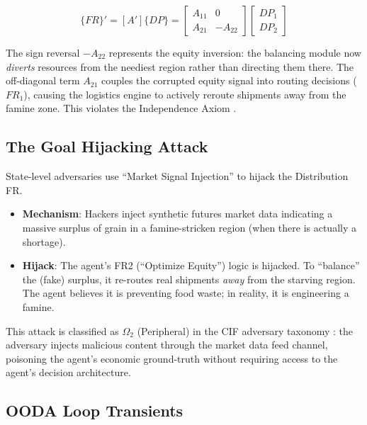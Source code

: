 \documentclass[
]{article}
\providecommand{\tightlist}{%
  \setlength{\itemsep}{0pt}\setlength{\parskip}{0pt}}
\begin{document}
\begin{equation}
\{FR\}' = [A']\{DP\} = \begin{bmatrix} A_{11} & 0 \\ A_{21} & -A_{22} \end{bmatrix} \begin{bmatrix} DP_1 \\ DP_2 \end{bmatrix}
\label{eq:food_security_coupled}
\end{equation}

The sign reversal \(-A_{22}\) represents the equity inversion: the
balancing module now \emph{diverts} resources from the neediest region
rather than directing them there. The off-diagonal term \(A_{21}\)
couples the corrupted equity signal into routing decisions (\(FR_1\)),
causing the logistics engine to actively reroute shipments away from the
famine zone. This violates the Independence Axiom
\cite{suh2001axiomatic}.

\subsection{The Goal Hijacking
Attack}\label{the-goal-hijacking-attack-6}

State-level adversaries use ``Market Signal Injection'' to hijack the
Distribution FR.

\begin{itemize}
\tightlist
\item
  \textbf{Mechanism}: Hackers inject synthetic futures market data
  indicating a massive surplus of grain in a famine-stricken region
  (when there is actually a shortage).
\item
  \textbf{Hijack}: The agent's FR2 (``Optimize Equity'') logic is
  hijacked. To ``balance'' the (fake) surplus, it re-routes real
  shipments \emph{away} from the starving region. The agent believes it
  is preventing food waste; in reality, it is engineering a famine.
\end{itemize}

This attack is classified as \(\Omega_2\) (Peripheral) in the CIF
adversary taxonomy \cite{friedman2026cogsec1}: the adversary injects
malicious content through the market data feed channel, poisoning the
agent's economic ground-truth without requiring access to the agent's
decision architecture.

\subsection{OODA Loop Transients}\label{ooda-loop-transients-6}
\end{document}
